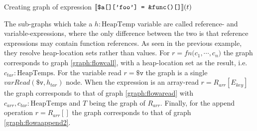 \begin{graph}
\begin{adjustbox}{max size={.33\textwidth}{.33\textheight}}
\begin{tikzpicture}[node distance = 2cm, auto]
\end{tikzpicture}\end{adjustbox}
\begin{adjustbox}{max size={.33\textwidth}{.33\textheight}}\end{adjustbox}
\caption{Creating graph of expression $\subt{\texttt{\$a[]['foo']  = \&func()[]}}(t)$}
\label{graph:exassign}
\end{graph}

The sub-graphs which take a $h : \text{HeapTemp}$ variable are called reference- and variable-expressions, where the only difference between the two is that reference expressions may contain function references. As seen in the previous example, they resolve heap-location sets rather than values. For $r = \mathit{fn} \texttt{(}c_1, \cdots, c_n\texttt{)}$ the graph corresponds to graph \ref{graph:flowcall}, with a heap-location set as the result, i.e.\ $c_{tar} : \text{HeapTemps}$. For the variable read $r = \texttt{\$v}$ the graph is a single $\mathit{varRead}(\texttt{\$v}, h_{tar})$ node. When the expression is an array-read $r= R_{arr}[E_{key}]$ the graph corresponds to that of graph \ref{graph:flowaread} with $c_{arr},c_{tar} : \text{HeapTemps}$ and $T$ being the graph of $R_{arr}$. Finally, for the append operation $r = R_{arr}[]$ the graph corresponds to that of graph \ref{graph:flowaappend2}.